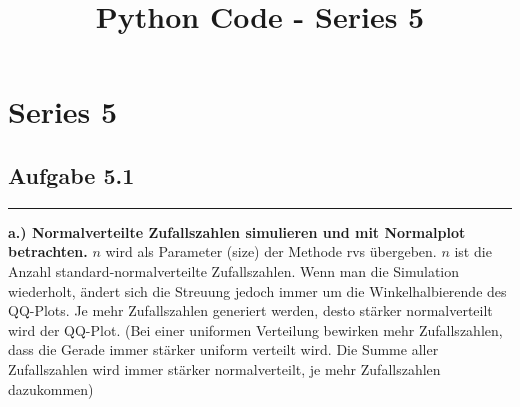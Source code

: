 \documentclass[11pt]{article}
\title{Python Code - Series 5}
\begin{document}
    
    
    \maketitle
    
    

    
    \section{Series 5}\label{series-5}

    \subsection{Aufgabe 5.1}\label{aufgabe-5.1}

    \begin{center}\rule{0.5\linewidth}{\linethickness}\end{center}

\textbf{a.) Normalverteilte Zufallszahlen simulieren und mit Normalplot
betrachten.} \(n\) wird als Parameter (size) der Methode rvs übergeben.
\(n\) ist die Anzahl standard-normalverteilte Zufallszahlen. Wenn man
die Simulation wiederholt, ändert sich die Streuung jedoch immer um die
Winkelhalbierende des QQ-Plots. Je mehr Zufallszahlen generiert werden,
desto stärker normalverteilt wird der QQ-Plot. (Bei einer uniformen
Verteilung bewirken mehr Zufallszahlen, dass die Gerade immer stärker
uniform verteilt wird. Die Summe aller Zufallszahlen wird immer stärker
normalverteilt, je mehr Zufallszahlen dazukommen)
\end{document}
